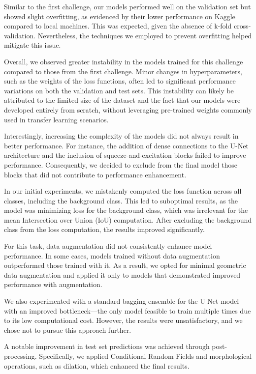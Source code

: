 \documentclass[11pt]{article}
\begin{document}
\begin{multicols}{2}
    Similar to the first challenge, our models performed well on the validation set but showed slight overfitting, as evidenced by their lower performance on Kaggle compared to local machines. This was expected, given the absence of k-fold cross-validation. Nevertheless, the techniques we employed to prevent overfitting helped mitigate this issue.

    Overall, we observed greater instability in the models trained for this challenge compared to those from the first challenge. Minor changes in hyperparameters, such as the weights of the loss functions, often led to significant performance variations on both the validation and test sets. This instability can likely be attributed to the limited size of the dataset and the fact that our models were developed entirely from scratch, without leveraging pre-trained weights commonly used in transfer learning scenarios.

    Interestingly, increasing the complexity of the models did not always result in better performance. For instance, the addition of dense connections to the U-Net architecture and the inclusion of squeeze-and-excitation blocks failed to improve performance. Consequently, we decided to exclude from the final model those blocks that did not contribute to performance enhancement.

    In our initial experiments, we mistakenly computed the loss function across all classes, including the background class. This led to suboptimal results, as the model was minimizing loss for the background class, which was irrelevant for the mean Intersection over Union (IoU) computation. After excluding the background class from the loss computation, the results improved significantly.

    For this task, data augmentation did not consistently enhance model performance. In some cases, models trained without data augmentation outperformed those trained with it. As a result, we opted for minimal geometric data augmentation and applied it only to models that demonstrated improved performance with augmentation.

    We also experimented with a standard bagging ensemble for the U-Net model with an improved bottleneck—the only model feasible to train multiple times due to its low computational cost. However, the results were unsatisfactory, and we chose not to pursue this approach further.

    A notable improvement in test set predictions was achieved through post-processing. Specifically, we applied Conditional Random Fields and morphological operations, such as dilation, which enhanced the final results.


\end{multicols}
\end{document}
